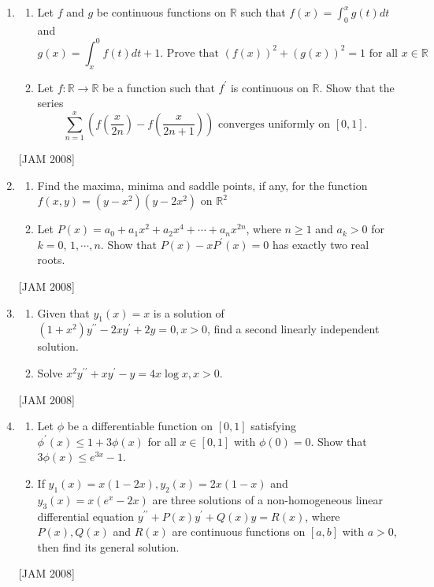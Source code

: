 \begin{enumerate}
\item 
\begin{enumerate}
\item Let $f$ and $g$ be continuous functions on $\mathbb{R}$ such that $f(x)=\int_{0}^{x} g(t) d t$ and
$$
g(x)=\int_{x}^{0} f(t) d t+1 \text {. Prove that }(f(x))^{2}+(g(x))^{2}=1 \text { for all } x \in \mathbb{R}
$$
\item  Let $f: \mathbb{R} \rightarrow \mathbb{R}$ be a function such that $f^{\prime}$ is continuous on $\mathbb{R}$. Show that the series
$$
\sum_{n=1}^{x}\left(f\left(\frac{x}{2 n}\right)-f\left(\frac{x}{2 n+1}\right)\right) \text { converges uniformly on }[0,1] \text {. }
$$
\end{enumerate}
 \hfill [JAM 2008]


\item 
\begin{enumerate}
\item   Find the maxima, minima and saddle points, if any, for the function $f(x, y)=\left(y-x^{2}\right)\left(y-2 x^{2}\right)$ on $\mathbb{R}^{2}$

\item  Let $P(x)=a_{0}+a_{1} x^{2}+a_{2} x^{4}+\cdots+a_{n} x^{2 n}$, where $n \geq 1$ and $a_{k}>0$ for $k=0$, $1, \cdots, n$. Show that $P(x)-x P^{\prime}(x)=0$ has exactly two real roots.
\end{enumerate}
 \hfill [JAM 2008]


\item 
\begin{enumerate}
\item   Given that $y_{1}(x)=x$ is a solution of $\left(1+x^{2}\right) y^{\prime \prime}-2 x y^{\prime}+2 y=0, x>0$, find a second linearly independent solution.

\item Solve $x^{2} y^{\prime \prime}+x y^{\prime}-y=4 x \log x, x>0$.

\end{enumerate}
 \hfill [JAM 2008]

\item 
\begin{enumerate}
\item   Let $\phi$ be a differentiable function on $[0,1]$ satisfying $\phi^{\prime}(x) \leq 1+3 \phi(x)$ for all $x \in[0,1]$ with $\phi(0)=0$. Show that $3 \phi(x) \leq e^{3 x}-1$.

\item  If $y_{1}(x)=x(1-2 x), y_{2}(x)=2 x(1-x)$ and $y_{3}(x)=x\left(e^{x}-2 x\right)$ are three solutions of a non-homogeneous linear differential equation $y^{\prime \prime}+P(x) y^{\prime}+Q(x) y=R(x)$, where $P(x), Q(x)$ and $R(x)$ are continuous functions on $[a, b]$ with $a>0$, then find its general solution.
\end{enumerate}
 \hfill [JAM 2008]



\end{enumerate}
